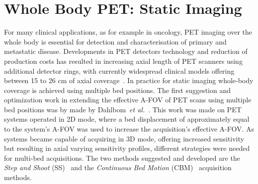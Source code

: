 \section{Whole Body PET: Static Imaging}
For many clinical applications, as for example in oncology, PET imaging over the whole body is essential for detection and characterisation of primary and metastatic disease. Developments in PET detectors technology and reduction of production costs has resulted in increasing axial length of PET scanners using additional detector rings, with currently widespread clinical models offering between 15 to 26 cm of axial coverage~\cite{Vandenberghe2020}.
In practice for static imaging whole-body coverage is achieved using multiple bed positions. The first suggestion and optimization work in extending the effective A-FOV of PET scans using multiple bed positions was by made by Dahlbom~\textit{et al.}~\cite{Dahlbom1992}. This work was made on PET systems operated in 2D mode, where a bed displacement of approximately equal to the system's A-FOV was used to increase the acquisition's effective A-FOV. As systems became capable of acquiring in 3D mode, offering increased sensitivity but resulting in axial varying sensitivity profiles, different strategies were needed for multi-bed acquisitions. The two methods suggested and developed are the \textit{Step and Shoot} (SS)~\cite{Schubert1996} and the \textit{Continuous Bed Motion} (CBM)~\cite{Panin2014} acquisition methods.


